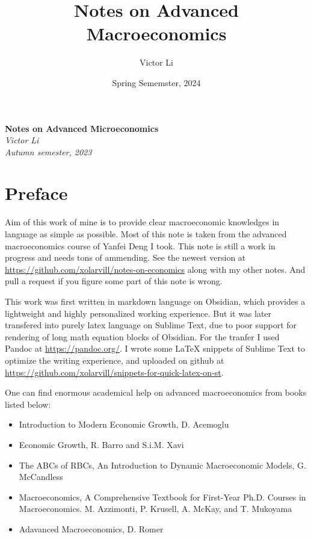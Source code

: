 \documentclass{article}
\title{Notes on Advanced Macroeconomics}
\author{Victor Li}
\date{Spring Sememster, 2024}
\providecommand{\tightlist}{
  \setlength{\itemsep}{0pt}
  \setlength{\parskip}{0pt}}
\begin{document}
\begin{titlepage}
   \begin{center}
      \Large\textbf{Notes on Advanced Microeconomics}\\
      \large\textit{Victor Li}\\
      \large\textit{Autumn semester, 2023}
   \end{center}
\end{titlepage}

\newpage
\tableofcontents

\newpage
{}
\section*{Preface}

Aim of this work of mine is to provide clear macroeconomic knowledges in language as simple as possible. Most of this note is taken from the advanced macroeconomics course of Yanfei Deng I took. This note is still a work in progress and needs tons of ammending. See the newest version at \url{https://github.com/xolarvill/notes-on-economics} along with my other notes. And pull a request if you figure some part of this note is wrong.

This work was first written in markdown language on Obsidian, which provides a lightweight and highly personalized working experience. But it was later transfered into purely latex language on Sublime Text, due to poor support for rendering of long math equation blocks of Obsidian. For the tranfer I used Pandoc at \url{https://pandoc.org/}. I wrote some LaTeX snippets of Sublime Text to optimize the writing experience, and uploaded on github at \url{https://github.com/xolarvill/snippets-for-quick-latex-on-st}.

One can find enormous academical help on advanced macroeconomics from books listed below:
\begin{itemize}
\tightlist
  \item Introduction to Modern Economic Growth, D. Acemoglu
  \item Economic Growth, R. Barro and S.i.M. Xavi
  \item The ABCs of RBCs, An Introduction to Dynamic Macroeconomic Models, G. McCandless
  \item Macroeconomics, A Comprehensive Textbook for First-Year Ph.D. Courses in Macroeconomics. M. Azzimonti, P. Krusell, A. McKay, and T. Mukoyama
  \item Adavanced Macroeconomics, D. Romer
\end{itemize}
\end{document}
